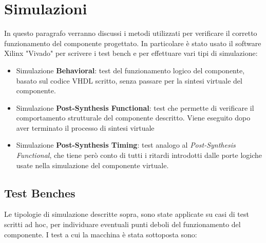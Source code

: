 \documentclass{article}
\begin{document}
\section{Simulazioni}

In questo paragrafo verranno discussi i metodi utilizzati per verificare il corretto funzionamento del componente progettato. In particolare è stato usato il software Xilinx "Vivado" per scrivere i test bench e per effettuare vari tipi di simulazione:

\begin{itemize}

\item Simulazione \textbf{Behavioral}: test del funzionamento logico del componente, basato sul codice VHDL scritto, senza passare per la sintesi virtuale del componente.

\item Simulazione \textbf{Post-Synthesis Functional}: test che permette di verificare il comportamento strutturale del componente descritto. Viene eseguito dopo aver terminato il processo di sintesi virtuale

\item Simulazione \textbf{Post-Synthesis Timing}: test analogo al \textit{Post-Synthesis Functional}, che tiene però conto di tutti i ritardi introdotti dalle porte logiche usate nella simulazione del componente virtuale.

\end{itemize}

\subsection{Test Benches}

Le tipologie di simulazione descritte sopra, sono state applicate su casi di test scritti ad hoc, per individuare eventuali punti deboli del funzionamento del componente. I test a cui la macchina è stata sottoposta sono:
\end{document}
